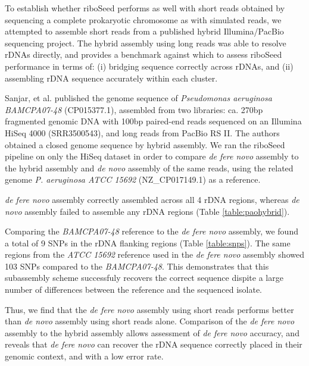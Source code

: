 \documentclass[a4,center,fleqn]{NAR}
\begin{document}
To establish whether riboSeed performs as well with short reads obtained by sequencing a complete prokaryotic chromosome as with simulated reads, we attempted to assemble short reads from a published hybrid Illumina/PacBio sequencing project. The hybrid assembly using long reads was able to resolve rDNAs directly, and provides a benchmark against which to assess riboSeed performance in terms of: (i) bridging sequence correctly across rDNAs, and (ii) assembling rDNA sequence accurately within each cluster.


Sanjar, et al. published the genome sequence of \textit{Pseudomonas aeruginosa BAMCPA07-48} (CP015377.1)\cite{Sanjar2016}, assembled from two libraries: ca. 270bp fragmented genomic DNA with 100bp paired-end reads sequenced on an Illumina HiSeq 4000 (SRR3500543), and long reads from PacBio RS II. The authors obtained a closed genome sequence by hybrid assembly. We ran the riboSeed pipeline on only the HiSeq dataset in order to compare \textit{de fere novo} assembly to the hybrid assembly and \textit{de novo} assembly of the same reads, using the related genome \textit{P. aeruginosa ATCC 15692} (NZ\_CP017149.1) as a reference.

\textit{de fere novo} assembly correctly assembled across all 4 rDNA regions, whereas \textit{de novo} assembly failed to assemble any rDNA regions (Table \ref{table:paohybrid}).

Comparing the \textit{BAMCPA07-48} reference to the \textit{de fere novo} assembly, we found a total of 9 SNPs in the rDNA flanking regions (Table \ref{table:snps}). The same regions from the \textit{ATCC 15692} reference used in the \textit{de fere novo} assembly showed 103 SNPs compared to the \textit{BAMCPA07-48}.  This demonstrates that this subassembly scheme successfuly recovers the correct sequence dispite a large number of differences between the reference and the sequenced isolate.

Thus, we find that the \textit{de fere novo} assembly using short reads performs better than \textit{de novo} assembly using short reads alone. Comparison of the \textit{de fere novo} assembly to the hybrid assembly allows assessment of \textit{de fere novo} accuracy, and reveals that \textit{de fere novo} can recover the rDNA sequence correctly placed in their genomic context, and with a low error rate.
\end{document}

